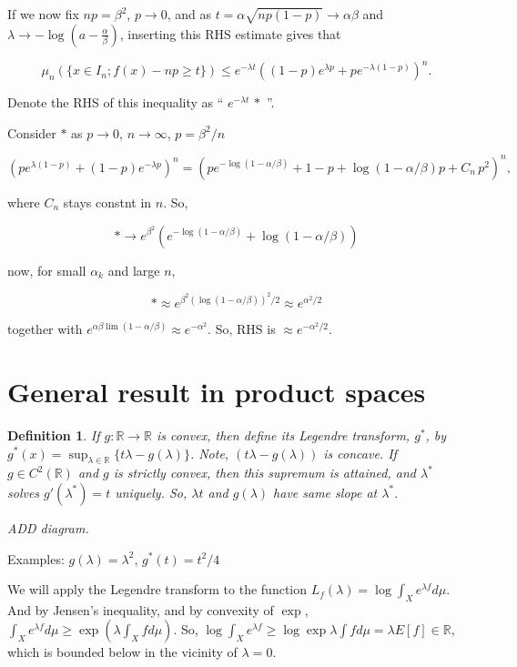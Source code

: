 \documentclass[12pt]{article}
\newtheorem{defn}[thm]{Definition}
\theoremstyle{remark}
\newcommand{\reals}[0] { \mathbb{R}}
\newcommand{\rarw}[0] { \rightarrow }
\begin{document}
If we now fix $np = \beta^2$, $p \rarw 0$, and as $t = \alpha \sqrt{ np(1-p)} \rarw \alpha \beta $  and $\lambda \rarw - \log(a-\frac{\alpha}{\beta})$, inserting this RHS estimate gives that

$$
\mu_n( \{  x \in I_n; f(x) - np \ge t \} ) \le e^{-\lambda t}  \left( (1-p) e^{\lambda p} + p e^{-\lambda (1-p) } \right)^n.
$$

Denote the RHS of this inequality as  `` $ e^{- \lambda t} \, *$ ''.

Consider $*$ as $p \rarw 0$, $n \rarw \infty$, $p = \beta^2/n$ 

$$
\left( p e^{\lambda (1-p)} + (1-p) e^{-\lambda p } \right)^n =  \left( p e^{-\log(1-\alpha/\beta)} + 1 - p + \log(1-\alpha / \beta) p + C_n \, p^2 \right)^n,
$$

where $C_n$ stays constnt in $n$. So,

$$
* \rarw e^{\beta^2} (e^{- \log (1- \alpha / \beta)} + \log(1- \alpha / \beta ) )
$$


now, for small $\alpha_k$ and large $n$, 

$$
 * \approx e^{ \beta^2 ( \log(1- \alpha / \beta) )^2 /2 } \approx e^{ \alpha^2 /2}
$$


together with $ e^{\alpha \beta \lim (1- \alpha / \beta) } \approx e^{- \alpha^2}$. So, RHS is $\approx e^{- \alpha ^2 /2}$.



\section{General result in product spaces}


\begin{defn} If $g: \reals \rarw \reals$ is convex, then define its Legendre transform, $g^*$, by $g^*(x) = \sup_{\lambda \in \reals} \{t \lambda - g(\lambda) \}$. Note, $( t \lambda - g(\lambda) )$ is concave. If $g \in C^2(\reals)$ and $g$ is strictly convex, then this supremum is attained, and $\lambda^*$ solves $g'(\lambda^*) = t$ uniquely. So, $\lambda t$ and $g(\lambda)$ have same slope at $\lambda^*$.

ADD diagram.
\end{defn}


Examples: $g(\lambda) = \lambda^2$, $g^*(t) = t^2/4$


We will apply the Legendre transform to the function $L_f(\lambda) = \log \int_X e^{\lambda f} d\mu$. And by Jensen's inequality, and by convexity of $\exp$, $\int_X e^{\lambda f} d \mu \ge \exp \left(        \lambda \int_X f d\mu \right)$. So, $\log \int_X e^{\lambda f} \ge \log \exp \lambda \int f d \mu   = \lambda E[f] \in \reals$, which is bounded below in the vicinity of $\lambda = 0$. 
\end{document}
